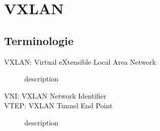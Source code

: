 

\section{VXLAN}
\subsection{Terminologie}
\begin{description}
	\item[VXLAN: Virtual eXtensible Local Area Network] description
	\item[VNI: VXLAN Network Identifier] 
	\item[VTEP: VXLAN Tunnel End Point] description 

\end{description}

